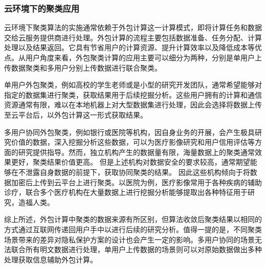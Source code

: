 \subsubsection{云环境下的聚类应用}
\label{juleiyanjiu}
云环境下聚类算法的实施通常依赖于外包计算这一计算模式，即将计算任务和数据交给云服务提供商进行处理。外包计算的流程主要包括数据准备、任务分配、计算处理以及结果返回。它具有节省用户的计算资源、提升计算效率以及降低成本等优点。从用户角度来看，外包聚类计算的应用主要可以细分为两种，分别是单用户上传数据聚类和多用户分别上传数据进行联合聚类。

单用户外包聚类，例如高校的学生老师或是小型的研究开发团队，通常希望能够对指定的数据集进行聚类，获取结果用于后续挖掘分析。这些用户拥有的计算和通信资源通常有限，难以在本地机器上对大型数据集进行处理，因此会选择将数据上传至云平台后，以外包计算这一形式获取结果。

多用户协同外包聚类，例如银行或医院等机构，因自身业务的开展，会产生极具研究价值的数据，深入挖掘分析这些数据，可以为医疗影像研究和用户信用评估等方面的研究提供指导。然而，独立机构产生的数据量有限，海量数据上的聚类通常效果更好，聚类结果价值更高。
但是上述机构对数据安全的要求较高，通常期望能够在不泄露自身数据的前提下，获取协同聚类的结果。
因此这些机构倾向于将数据加密后上传到云平台上进行聚类。以医院为例，医疗影像常用于各种疾病的辅助诊疗，联合多个医疗机构在大量数据上进行挖掘分析能够提取出各种特征用于研究，造福人类。

综上所述，外包计算中聚类的数据来源有所区别，但算法收敛后聚类结果以相同的方式通过互联网传递回用户手中以进行后续的研究分析。值得一提的是，不同聚类场景带来的差异对隐私保护方案的设计也会产生一定的影响。多用户协同的场景无法联合所有明文数据进行处理，单用户上传数据的场景则可以对原始数据做出多种处理获取信息辅助外包计算。
%
%
%
